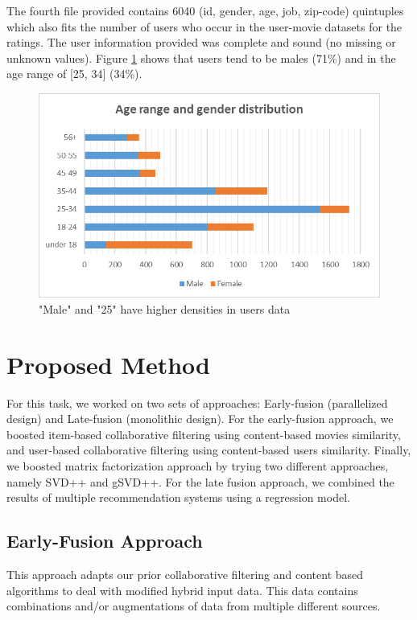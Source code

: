 \documentclass{sigish}
\begin{document}
The fourth file provided contains 6040 (id, gender, age, job, zip-code) quintuples which also fits the number of users who occur in the user-movie datasets for the ratings. The user information provided was complete and sound (no missing or unknown values). Figure \ref{fig:agerangegender} shows that users tend to be males (71\%) and in the age range of [25, 34] (34\%).

\begin{figure}
\centering
\includegraphics[width=\columnwidth]{images/agerange_gender.png}
\caption{"Male" and "25" have higher densities in users data}
\label{fig:agerangegender}
\end{figure}

\section{Proposed Method}

For this task, we worked on two sets of approaches: Early-fusion (parallelized design) and Late-fusion (monolithic design). For the early-fusion approach, we boosted item-based collaborative filtering using content-based movies similarity, and user-based collaborative filtering using content-based users similarity.  Finally, we boosted matrix factorization approach by trying two different approaches, namely SVD++ and gSVD++.
For the late fusion approach, we combined the results of multiple recommendation systems using a regression model.

\subsection{Early-Fusion Approach}

This approach adapts our prior collaborative filtering and content based algorithms to deal with modified hybrid input data. This data contains combinations and/or augmentations of data from multiple different sources.
\end{document}
